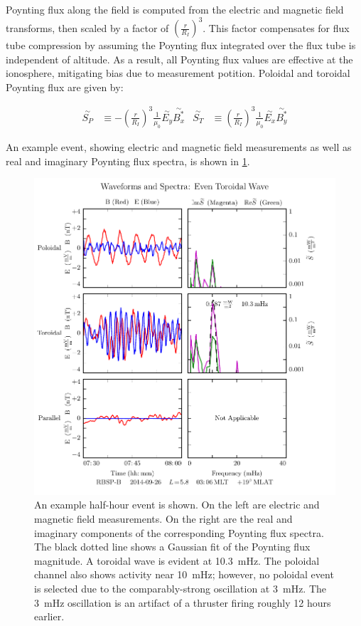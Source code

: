 \documentclass[draft,linenumbers]{agujournal}
\begin{document}
Poynting flux along the field is computed from the electric and magnetic field transforms, then scaled by a factor of $\left( \frac{r}{R_I} \right)^3$. This factor compensates for flux tube compression by assuming the Poynting flux integrated over the flux tube is independent of altitude. As a result, all Poynting flux values are effective at the ionosphere, mitigating bias due to measurement potition. Poloidal and toroidal Poynting flux are given by:
\begin{linenomath*}
\begin{align}
    \overset{\sim}{S_P} &\equiv -\left( \frac{r}{R_I} \right)^3\frac{1}{\mu_0} \overset{\sim}{E_y} \overset{\sim}{B_x^*} &
    \overset{\sim}{S_T} &\equiv  \left( \frac{r}{R_I} \right)^3\frac{1}{\mu_0} \overset{\sim}{E_x} \overset{\sim}{B_y^*}
\end{align}
\end{linenomath*}

An example event, showing electric and magnetic field measurements as well as real and imaginary Poynting flux spectra, is shown in \cref{fig_event}.

\begin{figure}
    \begin{center}
    \includegraphics[width=\textwidth]{figures/fig_event.pdf}
    \caption{
        An example half-hour event is shown. On the left are electric and magnetic field measurements. On the right are the real and imaginary components of the corresponding Poynting flux spectra. The black dotted line shows a Gaussian fit of the Poynting flux magnitude. A toroidal wave is evident at \SI{10.3}{\mHz}. The poloidal channel also shows activity near \SI{10}{\mHz}; however, no poloidal event is selected due to the comparably-strong oscillation at \SI{3}{\mHz}. The \SI{3}{\mHz} oscillation is an artifact of a thruster firing roughly 12 hours earlier.
    }
    \label{fig_event}
    \end{center}
\end{figure}
\end{document}
